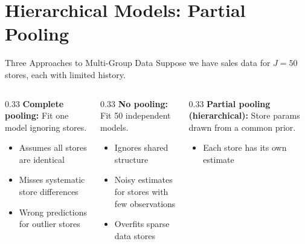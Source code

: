 \documentclass[aspectratio=169, 11pt]{beamer}
\begin{document}
\section{Hierarchical Models: Partial Pooling}


\begin{frame}{Three Approaches to Multi-Group Data}
  Suppose we have sales data for $J = 50$ stores, each with limited history.
  \begin{columns}[T]
    \begin{column}{0.33\textwidth}
      \textbf{Complete pooling:}
      Fit one model ignoring stores.
      {
      \begin{itemize}\small
        \item Assumes all stores are identical
        \item Misses systematic store differences
        \item Wrong predictions for outlier stores
      \end{itemize}}
    \end{column}
    \begin{column}{0.33\textwidth}
      \textbf{No pooling:}
      Fit 50 independent models.
      {
      \begin{itemize}\small
        \item Ignores shared structure
        \item Noisy estimates for stores with few observations
        \item Overfits sparse data stores
      \end{itemize}}
    \end{column}
    \begin{column}{0.33\textwidth}
      \textbf{Partial pooling (hierarchical):}
      Store params drawn from a common prior.
      {
      \begin{itemize}\small
        \item Each store has its own estimate

\end{itemize}}
\end{column}
\end{columns}
\end{frame}
\end{document}
